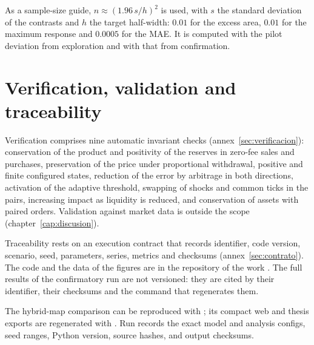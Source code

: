 As a sample-size guide, $n\approx(1.96\,s/h)^2$ is used, with $s$ the standard deviation of the contrasts and $h$ the target half-width: $0.01$ for the excess area, $0.01$ for the maximum response and $0.0005$ for the MAE. It is computed with the pilot deviation from exploration and with that from confirmation.

\section{Verification, validation and traceability}

Verification comprises nine automatic invariant checks (annex~\ref{sec:verificacion}): conservation of the product and positivity of the reserves in zero-fee sales and purchases, preservation of the price under proportional withdrawal, positive and finite configured states, reduction of the error by arbitrage in both directions, activation of the adaptive threshold, swapping of shocks and common ticks in the pairs, increasing impact as liquidity is reduced, and conservation of assets with paired orders. Validation against market data is outside the scope (chapter~\ref{cap:discusion}).

Traceability rests on an execution contract that records identifier, code version, scenario, seed, parameters, series, metrics and checksums (annex~\ref{sec:contrato}). The code and the data of the figures are in the repository of the work \cite{calderon2026repository}. The full results of the confirmatory run are not versioned: they are cited by their identifier, their checksums and the command that regenerates them.

The hybrid-map comparison can be reproduced with ; its compact web and thesis exports are regenerated with . Run \code{\HybridRunID} records the exact model and analysis configs, seed ranges, Python version, source hashes, and output checksums.
